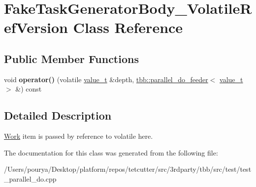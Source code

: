 \hypertarget{classFakeTaskGeneratorBody__VolatileRefVersion}{}\section{Fake\+Task\+Generator\+Body\+\_\+\+Volatile\+Ref\+Version Class Reference}
\label{classFakeTaskGeneratorBody__VolatileRefVersion}
\subsection*{Public Member Functions}
\begin{DoxyCompactItemize}
\item 
\hypertarget{classFakeTaskGeneratorBody__VolatileRefVersion_a72179b9570f9826aa9462104351cf074}{}void {\bfseries operator()} (volatile \hyperlink{classvalue__t}{value\+\_\+t} \&depth, \hyperlink{classtbb_1_1parallel__do__feeder}{tbb\+::parallel\+\_\+do\+\_\+feeder}$<$ \hyperlink{classvalue__t}{value\+\_\+t} $>$ \&) const \label{classFakeTaskGeneratorBody__VolatileRefVersion_a72179b9570f9826aa9462104351cf074}

\end{DoxyCompactItemize}


\subsection{Detailed Description}
\hyperlink{structWork}{Work} item is passed by reference to volatile here. 

The documentation for this class was generated from the following file\+:\begin{DoxyCompactItemize}
\item 
/\+Users/pourya/\+Desktop/platform/repos/tetcutter/src/3rdparty/tbb/src/test/test\+\_\+parallel\+\_\+do.\+cpp\end{DoxyCompactItemize}
